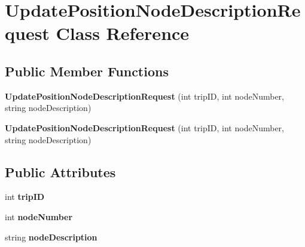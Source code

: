 \hypertarget{class_update_position_node_description_request}{
\section{UpdatePositionNodeDescriptionRequest Class Reference}
\label{class_update_position_node_description_request}
}
\subsection*{Public Member Functions}
\begin{DoxyCompactItemize}
\item 
\hypertarget{class_update_position_node_description_request_a5727aad8adbd42e6a32d6d38c0333098}{
{\bfseries UpdatePositionNodeDescriptionRequest} (int tripID, int nodeNumber, string nodeDescription)}
\label{class_update_position_node_description_request_a5727aad8adbd42e6a32d6d38c0333098}

\item 
\hypertarget{class_update_position_node_description_request_a5727aad8adbd42e6a32d6d38c0333098}{
{\bfseries UpdatePositionNodeDescriptionRequest} (int tripID, int nodeNumber, string nodeDescription)}
\label{class_update_position_node_description_request_a5727aad8adbd42e6a32d6d38c0333098}

\end{DoxyCompactItemize}
\subsection*{Public Attributes}
\begin{DoxyCompactItemize}
\item 
\hypertarget{class_update_position_node_description_request_af0d00f58de4bcd303cfcd41944511fa7}{
int {\bfseries tripID}}
\label{class_update_position_node_description_request_af0d00f58de4bcd303cfcd41944511fa7}

\item 
\hypertarget{class_update_position_node_description_request_ab75aabd4597ac0ce6ccfd6f47267a714}{
int {\bfseries nodeNumber}}
\label{class_update_position_node_description_request_ab75aabd4597ac0ce6ccfd6f47267a714}

\item 
\hypertarget{class_update_position_node_description_request_a99575267e5dd5518c0e54747b900fe00}{
string {\bfseries nodeDescription}}
\label{class_update_position_node_description_request_a99575267e5dd5518c0e54747b900fe00}

\end{DoxyCompactItemize}


